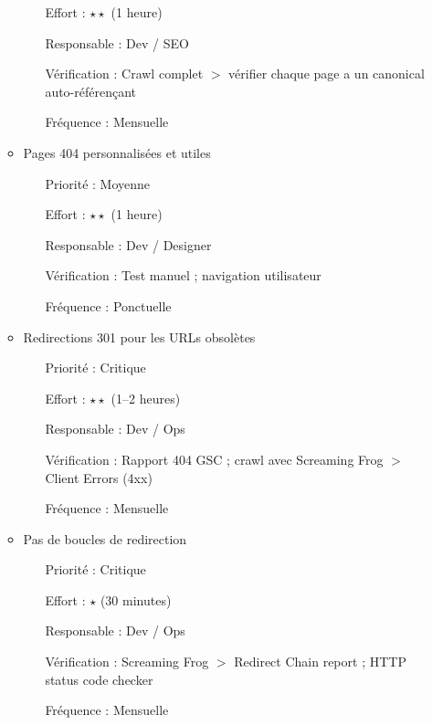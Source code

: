 \documentclass[12pt,a4paper,twoside]{report}
\begin{document}
\begin{enumerate}
\begin{itemize}
\begin{itemize}
            \item[Effort :] $\star\star$ (1 heure)
            \item[Responsable :] Dev / SEO
            \item[Vérification :] Crawl complet $>$ vérifier chaque page a un canonical auto-référençant
            \item[Fréquence :] Mensuelle
        \end{itemize}
        \item Pages 404 personnalisées et utiles
        \begin{itemize}
            \item[Priorité :] Moyenne
            \item[Effort :] $\star\star$ (1 heure)
            \item[Responsable :] Dev / Designer
            \item[Vérification :] Test manuel ; navigation utilisateur
            \item[Fréquence :] Ponctuelle
        \end{itemize}
        \item Redirections 301 pour les URLs obsolètes
        \begin{itemize}
            \item[Priorité :] Critique
            \item[Effort :] $\star\star$ (1--2 heures)
            \item[Responsable :] Dev / Ops
            \item[Vérification :] Rapport 404 GSC ; crawl avec Screaming Frog $>$ Client Errors (4xx)
            \item[Fréquence :] Mensuelle
        \end{itemize}
        \item Pas de boucles de redirection
        \begin{itemize}
            \item[Priorité :] Critique
            \item[Effort :] $\star$ (30 minutes)
            \item[Responsable :] Dev / Ops
            \item[Vérification :] Screaming Frog $>$ Redirect Chain report ; HTTP status code checker
            \item[Fréquence :] Mensuelle
        \end{itemize}
    \end{itemize}


\end{enumerate}
\end{document}
